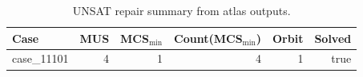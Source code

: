 \begin{table}[t]
\centering
\small
\begin{tabular}{lrrrrr}
\toprule
Case & MUS & MCS$_{\min}$ & Count(MCS$_{\min}$) & Orbit & Solved \\
\midrule
case\_11101 & 4 & 1 & 4 & 1 & true \\
\bottomrule
\end{tabular}
\caption{UNSAT repair summary from atlas outputs.}
\label{tab:sen24-repairs}
\end{table}
